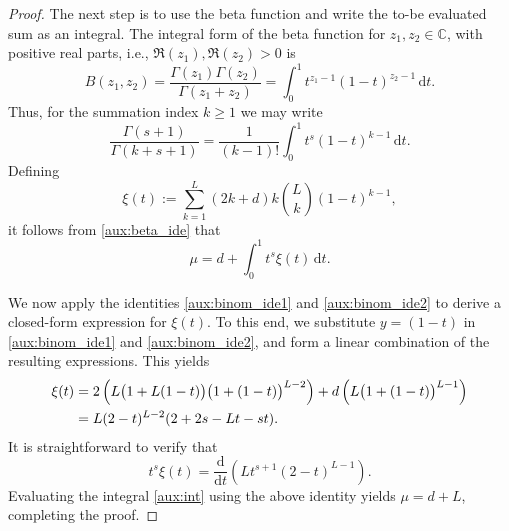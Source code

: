 \documentclass[10pt,a4paper]{amsart}
\newcommand{\C}{\mathbb{C}}
\newcommand{\di}{\mathrm{d}}   %
\begin{document}
\begin{proof}
    The next step is to use the beta function and write the to-be evaluated sum as an integral.
    The integral form of the beta function for \( z_1,z_2 \in \C \), with positive real parts, i.e., \( \Re(z_1), \Re(z_2) > 0 \) is
    \begin{equation*}
        B(z_1, z_2) = \frac{\Gamma(z_1)\Gamma(z_2)}{\Gamma(z_1+z_2)} = \int^1_0 t^{z_1-1} (1-t)^{z_2-1} \, \di t.
    \end{equation*}
    Thus, for the summation index \( k \geq 1 \) we may write
    \begin{equation} \label{aux:beta_ide}
        \frac{\Gamma(s+1)}{\Gamma(k+s+1)} = \frac{1}{(k-1)!} \int^1_0 t^s (1-t)^{k-1} \, \di t.
    \end{equation}
    Defining
    \begin{equation} \label{aux:sigma}
        \xi(t) := \sum^L_{k=1} (2k+d)k\binom{L}{k}(1-t)^{k-1},
    \end{equation}
    it follows from \eqref{aux:beta_ide} that
    \begin{equation} \label{aux:int}
        \mu = d + \int^1_0 t^s \xi(t) \, \di t.
    \end{equation}


    We now apply the identities \eqref{aux:binom_ide1} and \eqref{aux:binom_ide2} to derive a closed-form expression for \( \xi(t) \). 
    To this end, we substitute \( y = (1-t) \) in \eqref{aux:binom_ide1} and \eqref{aux:binom_ide2}, and form a linear combination of the resulting expressions.
    This yields
    \begin{align}
        \xi(t) &= 2 \left( L \big( 1 + L(1-t) \big) \big(1 + (1-t) \big)^{L-2} \right) + d \left( L \big(1 + (1-t) \big)^{L-1} \right) \notag \\
        &= L(2-t)^{L-2}(2 + 2s -Lt -st).
    \end{align}
    It is straightforward to verify that
    \begin{equation*}
        t^s \xi(t) = \frac{\di}{\di t} \left( L t^{s+1} (2-t)^{L-1} \right).
    \end{equation*}
    Evaluating the integral \eqref{aux:int} using the above identity yields \( \mu = d + L \), completing the proof.
\end{proof}
\end{document}
